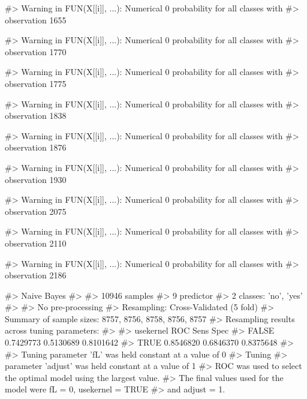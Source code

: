 \begin{Schunk}
\begin{Soutput}
#> Warning in FUN(X[[i]], ...): Numerical 0 probability for all classes with
#> observation 1655
\end{Soutput}
\begin{Soutput}
#> Warning in FUN(X[[i]], ...): Numerical 0 probability for all classes with
#> observation 1770
\end{Soutput}
\begin{Soutput}
#> Warning in FUN(X[[i]], ...): Numerical 0 probability for all classes with
#> observation 1775
\end{Soutput}
\begin{Soutput}
#> Warning in FUN(X[[i]], ...): Numerical 0 probability for all classes with
#> observation 1838
\end{Soutput}
\begin{Soutput}
#> Warning in FUN(X[[i]], ...): Numerical 0 probability for all classes with
#> observation 1876
\end{Soutput}
\begin{Soutput}
#> Warning in FUN(X[[i]], ...): Numerical 0 probability for all classes with
#> observation 1930
\end{Soutput}
\begin{Soutput}
#> Warning in FUN(X[[i]], ...): Numerical 0 probability for all classes with
#> observation 2075
\end{Soutput}
\begin{Soutput}
#> Warning in FUN(X[[i]], ...): Numerical 0 probability for all classes with
#> observation 2110
\end{Soutput}
\begin{Soutput}
#> Warning in FUN(X[[i]], ...): Numerical 0 probability for all classes with
#> observation 2186
\end{Soutput}
\begin{Soutput}
#> Naive Bayes 
#> 
#> 10946 samples
#>     9 predictor
#>     2 classes: 'no', 'yes' 
#> 
#> No pre-processing
#> Resampling: Cross-Validated (5 fold) 
#> Summary of sample sizes: 8757, 8756, 8758, 8756, 8757 
#> Resampling results across tuning parameters:
#> 
#>   usekernel  ROC        Sens       Spec     
#>   FALSE      0.7429773  0.5130689  0.8101642
#>    TRUE      0.8546820  0.6846370  0.8375648
#> 
#> Tuning parameter 'fL' was held constant at a value of 0
#> Tuning
#>  parameter 'adjust' was held constant at a value of 1
#> ROC was used to select the optimal model using the largest value.
#> The final values used for the model were fL = 0, usekernel = TRUE
#>  and adjust = 1.
\end{Soutput}
\end{Schunk}

